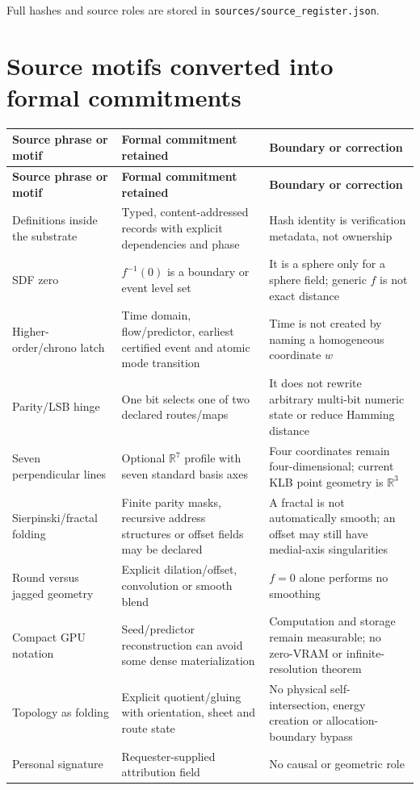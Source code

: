 \documentclass[10pt,a4paper]{article}
\newcommand{\Real}{\mathbb{R}}
\newcommand{\code}[1]{\texttt{#1}}
\begin{document}
Full hashes and source roles are stored in \code{sources/source\_register.json}.

\section{Source motifs converted into formal commitments}
\label{sec:motifs}

\begin{longtable}{@{}L{38mm}L{59mm}L{63mm}@{}}
\toprule
\textbf{Source phrase or motif} & \textbf{Formal commitment retained} & \textbf{Boundary or correction} \\
\midrule
\endfirsthead
\toprule
\textbf{Source phrase or motif} & \textbf{Formal commitment retained} & \textbf{Boundary or correction} \\
\midrule
\endhead
Definitions inside the substrate & Typed, content-addressed records with explicit dependencies and phase & Hash identity is verification metadata, not ownership \\
SDF zero & \(f^{-1}(0)\) is a boundary or event level set & It is a sphere only for a sphere field; generic \(f\) is not exact distance \\
Higher-order/chrono latch & Time domain, flow/predictor, earliest certified event and atomic mode transition & Time is not created by naming a homogeneous coordinate \(w\) \\
Parity/LSB hinge & One bit selects one of two declared routes/maps & It does not rewrite arbitrary multi-bit numeric state or reduce Hamming distance \\
Seven perpendicular lines & Optional \(\Real^7\) profile with seven standard basis axes & Four coordinates remain four-dimensional; current KLB point geometry is \(\Real^3\) \\
Sierpinski/fractal folding & Finite parity masks, recursive address structures or offset fields may be declared & A fractal is not automatically smooth; an offset may still have medial-axis singularities \\
Round versus jagged geometry & Explicit dilation/offset, convolution or smooth blend & \(f=0\) alone performs no smoothing \\
Compact GPU notation & Seed/predictor reconstruction can avoid some dense materialization & Computation and storage remain measurable; no zero-VRAM or infinite-resolution theorem \\
Topology as folding & Explicit quotient/gluing with orientation, sheet and route state & No physical self-intersection, energy creation or allocation-boundary bypass \\
Personal signature & Requester-supplied attribution field & No causal or geometric role \\
\bottomrule
\end{longtable}
\end{document}
